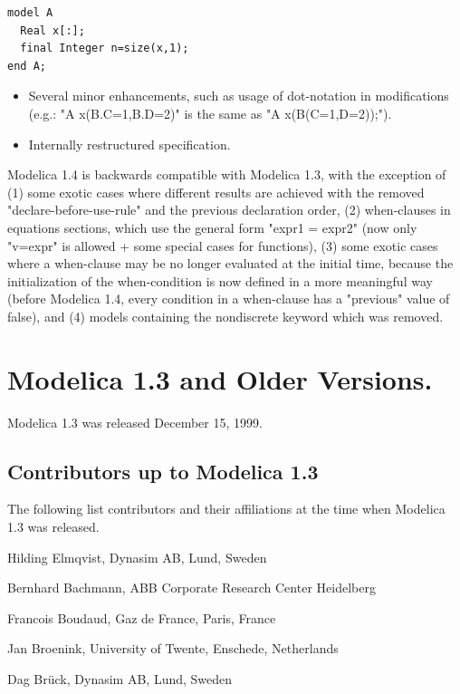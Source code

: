 \documentclass[10pt,a4paper]{report}
\def\doublelabel#1{\label{#1}\hypertarget{#1}{}}
\begin{document}
\begin{lstlisting}[language=modelica]
model A
  Real x[:];
  final Integer n=size(x,1);
end A;
\end{lstlisting}

\begin{itemize}
\item
  Several minor enhancements, such as usage of dot-notation in
  modifications\\
  (e.g.: "A x(B.C=1,B.D=2)" is the same as "A x(B(C=1,D=2));").
\item
  Internally restructured specification.
\end{itemize}

Modelica 1.4 is backwards compatible with Modelica 1.3, with the
exception of (1) some exotic cases where different results are achieved
with the removed "declare-before-use-rule" and the previous declaration
order, (2) when-clauses in equations sections, which use the general
form "expr1 = expr2" (now only "v=expr" is allowed + some special cases
for functions), (3) some exotic cases where a when-clause may be no
longer evaluated at the initial time, because the initialization of the
when-condition is now defined in a more meaningful way (before Modelica
1.4, every condition in a when-clause has a "previous" value of false),
and (4) models containing the nondiscrete keyword which was removed.

\section{Modelica 1.3 and Older Versions.}\doublelabel{modelica-1-3-and-older-versions}

Modelica 1.3 was released December 15, 1999.

\subsection{Contributors up to Modelica 1.3}\doublelabel{contributors-up-to-modelica-1-3}
The following list contributors and their affiliations at the time when
Modelica 1.3 was released.

Hilding Elmqvist, Dynasim AB, Lund, Sweden

Bernhard Bachmann, ABB Corporate Research Center Heidelberg

Francois Boudaud, Gaz de France, Paris, France

Jan Broenink, University of Twente, Enschede, Netherlands

Dag Brück, Dynasim AB, Lund, Sweden
\end{document}
